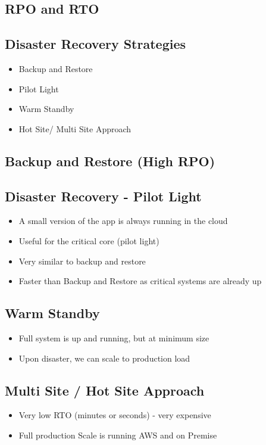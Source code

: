 {{\subsection{RPO and RTO}

\subsection{Disaster Recovery Strategies}
\begin{itemize}
    \item Backup and Restore
    \item Pilot Light
    \item Warm Standby
    \item Hot Site/ Multi Site Approach
\end{itemize}

\subsection{Backup and Restore (High RPO)}

\subsection{Disaster Recovery - Pilot Light}
\begin{itemize}
    \item A small version of the app is always running in the cloud
    \item Useful for the critical core (pilot light)
    \item Very similar to backup and restore
    \item Faster than Backup and Restore as critical systems are already up
\end{itemize}

\subsection{Warm Standby}
\begin{itemize}
    \item Full system is up and running, but at minimum size
    \item Upon disaster, we can scale to production load
\end{itemize}

\subsection{Multi Site / Hot Site Approach}
\begin{itemize}
    \item Very low RTO (minutes or seconds) - very expensive
    \item Full production Scale is running AWS and on Premise
\end{itemize}

}}
